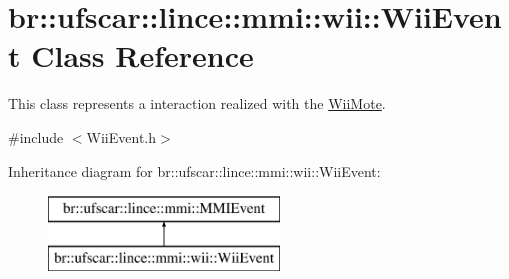 \hypertarget{classbr_1_1ufscar_1_1lince_1_1mmi_1_1wii_1_1WiiEvent}{
\section{br::ufscar::lince::mmi::wii::WiiEvent Class Reference}
\label{classbr_1_1ufscar_1_1lince_1_1mmi_1_1wii_1_1WiiEvent}
}


This class represents a interaction realized with the \hyperlink{classbr_1_1ufscar_1_1lince_1_1mmi_1_1wii_1_1WiiMote}{WiiMote}.  




{\ttfamily \#include $<$WiiEvent.h$>$}

Inheritance diagram for br::ufscar::lince::mmi::wii::WiiEvent:\begin{figure}[H]
\begin{center}
\leavevmode
\includegraphics[height=2cm]{classbr_1_1ufscar_1_1lince_1_1mmi_1_1wii_1_1WiiEvent}
\end{center}
\end{figure}
